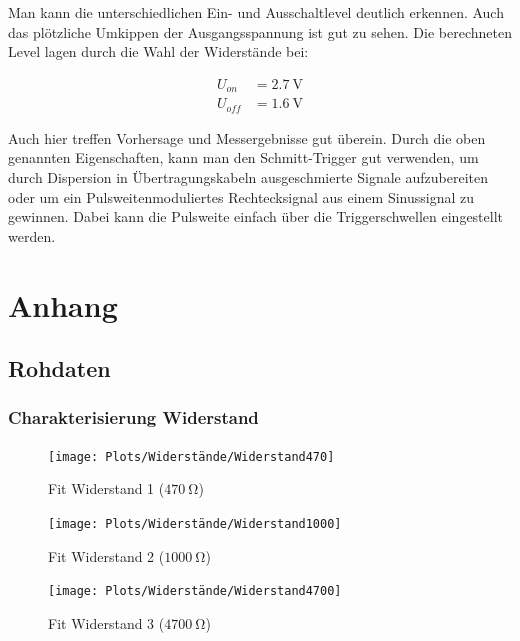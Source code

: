 \documentclass[12pt,twoside,a4paper]{scrartcl}
\begin{document}
			Man kann die unterschiedlichen Ein- und Ausschaltlevel deutlich erkennen. Auch das plötzliche Umkippen der Ausgangsspannung ist gut zu sehen.
			Die berechneten Level lagen durch die Wahl der Widerstände bei:

			\begin{align}
				U_{on} &= \SI{2.7}{\volt} \\
				U_{off} &= \SI{1.6}{\volt}
			\end{align}

			Auch hier treffen Vorhersage und Messergebnisse gut überein. Durch die oben genannten Eigenschaften, kann man den Schmitt-Trigger gut verwenden, um durch Dispersion in Übertragungskabeln ausgeschmierte Signale aufzubereiten oder um ein Pulsweitenmoduliertes Rechtecksignal aus einem Sinussignal zu gewinnen. Dabei kann die Pulsweite einfach über die Triggerschwellen eingestellt werden.

\newpage

\section{Anhang}
	\subsection{Rohdaten}
		\subsubsection{Charakterisierung Widerstand}
		\label{Daten::Widerstand}

			\begin{figure}[H]
				\centering
				\begin{minipage}{0.49 \textwidth}
						\texttt{[image: Plots/Widerstände/Widerstand470]}
				\caption{Fit Widerstand 1 ($\SI{470}{\ohm}$)}
				\end{minipage}
				\begin{minipage}{0.49 \textwidth}
						\texttt{[image: Plots/Widerstände/Widerstand1000]}
				\caption{Fit Widerstand 2 ($\SI{1000}{\ohm}$)}
				\end{minipage}
			\end{figure}

			\begin{figure}[H]
				\centering
				\texttt{[image: Plots/Widerstände/Widerstand4700]}
				\caption{Fit Widerstand 3 ($\SI{4700}{\ohm}$)}
		\end{figure}
\end{document}
